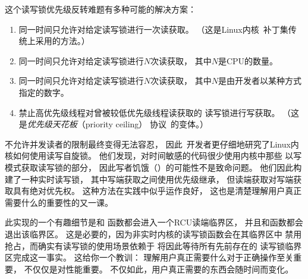 这个读写锁优先级反转难题有多种可能的解决方案：

\begin{enumerate}
\item	同一时间只允许对给定读写锁进行一次读获取。
	（这是Linux内核\rt\ 补丁集传统上采用的方法。）
\item	同一时间只允许对给定读写锁进行$N$次读获取，
	其中$N$是CPU的数量。
\item	同一时间只允许对给定读写锁进行$N$次读获取，
	其中$N$是由开发者以某种方式指定的数字。
\item	禁止高优先级线程对曾被较低优先级线程读获取的
	读写锁进行写获取。
	（这是\emph{优先级天花板}（priority ceiling）
	协议~\cite{LuiSha1990PriorityInheritance}的变体。）
\end{enumerate}

\QuickQuizEnd

不允许并发读者的限制最终变得无法容忍，
因此\rt\ 开发者更仔细地研究了Linux内核如何使用读写自旋锁。
他们发现，对时间敏感的代码很少使用内核中那些
以写模式获取读写锁的部分，
因此写者饥饿（）的可能性不是致命问题。
他们因此构建了一种实时读写锁，
其中写端获取之间使用优先级继承，
但读端获取对写端获取具有绝对优先权。
这种方法在实践中似乎运作良好，
这也是清楚理解用户真正需要什么的重要性的又一课。

此实现的一个有趣细节是和
函数都会进入一个RCU读端临界区，
并且和函数都会
退出该临界区。
这是必要的，因为非实时内核的读写锁函数会在其临界区中
禁用抢占，而确实有读写锁的使用场景依赖于
将因此等待所有先前存在的
读写锁临界区完成这一事实。
这给你一个教训：
理解用户真正需要什么对于正确操作至关重要，
不仅仅是对性能重要。
不仅如此，用户真正需要的东西会随时间而变化。

